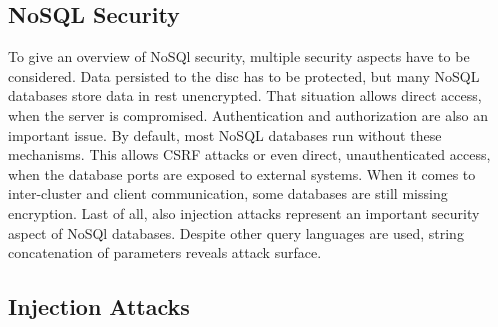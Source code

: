 \subsection{NoSQL Security}
To give an overview of NoSQl security, multiple security aspects have to be considered. Data persisted to the disc has to be protected, but many NoSQL databases store data in rest unencrypted. That situation allows direct access, when the server is compromised. Authentication and authorization are also an important issue. By default, most NoSQL databases run without these mechanisms. This allows CSRF attacks or even direct, unauthenticated access, when the database ports are exposed to external systems. When it comes to inter-cluster and client communication, some databases are still missing encryption. Last of all, also injection attacks represent an important security aspect of NoSQl databases. Despite other query languages are used, string concatenation of parameters reveals attack surface.    

\subsection{Injection Attacks}
